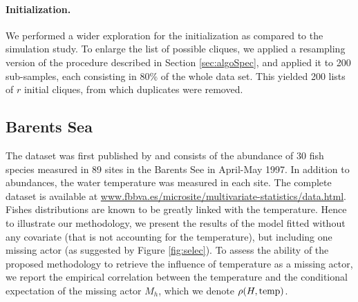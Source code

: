 \paragraph{Initialization. \\}
We performed a wider exploration for the initialization as compared to the simulation study. To enlarge the list of possible cliques, we applied a resampling version of the procedure described in Section \ref{sec:algoSpec}, and applied it to 200 sub-samples, each consisting in 80\% of the whole data set. This yielded 200 lists of $r$ initial cliques, from which duplicates were removed.

\subsection{Barents Sea}

The dataset was first published by \cite{FNA06} and consists of the abundance of 30 fish species measured in 89 sites in the Barents See in April-May 1997. In addition to abundances, the water temperature was measured in each site. The complete dataset is available at \url{www.fbbva.es/microsite/multivariate-statistics/data.html}. 
Fishes distributions are known to be greatly linked with the temperature. 
Hence to illustrate our methodology, 
we present the results of the model fitted without any covariate (that is not accounting for the temperature), but including one missing actor (as suggested by Figure \ref{fig:selec}). To assess the ability of the proposed methodology to retrieve the influence of temperature as a missing actor, we report the empirical correlation between the temperature and the conditional expectation of the missing actor $M_h$, which we denote ${\rho(H, \text{temp})}$.
 
